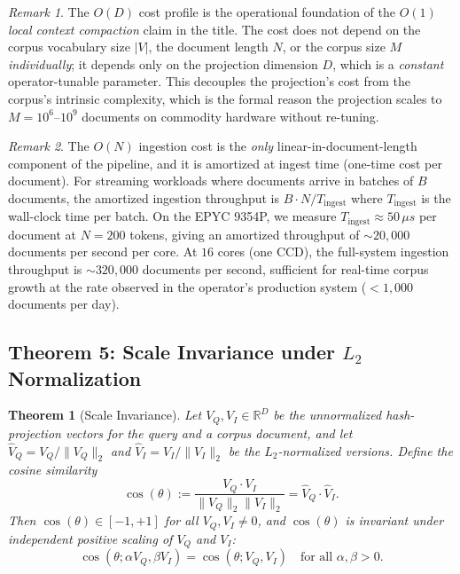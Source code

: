 \documentclass[10pt,twocolumn]{article}
\newtheorem{theorem}{Theorem}
\theoremstyle{definition}
\theoremstyle{remark}
\newtheorem{remark}{Remark}
\begin{document}
\begin{remark}
The $O(D)$ cost profile is the operational foundation of the
\emph{$O(1)$ local context compaction} claim in the title. The cost
does not depend on the corpus vocabulary size $|V|$, the document
length $N$, or the corpus size $M$ \emph{individually}; it depends
only on the projection dimension $D$, which is a \emph{constant}
operator-tunable parameter. This decouples the projection's cost from
the corpus's intrinsic complexity, which is the formal reason the
projection scales to $M = 10^6$--$10^9$ documents on commodity
hardware without re-tuning.
\end{remark}

\begin{remark}
The $O(N)$ ingestion cost is the \emph{only} linear-in-document-length
component of the pipeline, and it is amortized at ingest time (one-time
cost per document). For streaming workloads where documents arrive in
batches of $B$ documents, the amortized ingestion throughput is
$B \cdot N / T_{\mathrm{ingest}}$ where $T_{\mathrm{ingest}}$ is the
wall-clock time per batch. On the EPYC 9354P, we measure
$T_{\mathrm{ingest}} \approx 50 \,\mu s$ per document at $N = 200$
tokens, giving an amortized throughput of $\sim 20{,}000$ documents
per second per core. At $16$ cores (one CCD), the full-system ingestion
throughput is $\sim 320{,}000$ documents per second, sufficient for
real-time corpus growth at the rate observed in the operator's
production system ($< 1{,}000$ documents per day).
\end{remark}

\subsection{Theorem 5: Scale Invariance under $L_2$ Normalization}
\label{thm:scale-invariance}

\begin{theorem}[Scale Invariance]
\label{thm:scale-invariance}
Let $V_Q, V_I \in \mathbb{R}^D$ be the unnormalized hash-projection
vectors for the query and a corpus document, and let
$\hat{V}_Q = V_Q / \|V_Q\|_2$ and $\hat{V}_I = V_I / \|V_I\|_2$ be the
$L_2$-normalized versions. Define the cosine similarity
\begin{equation}
\cos(\theta) := \frac{V_Q \cdot V_I}{\|V_Q\|_2 \|V_I\|_2}
              = \hat{V}_Q \cdot \hat{V}_I.
\label{eq:thm5-cosine}
\end{equation}
Then $\cos(\theta) \in [-1, +1]$ for all $V_Q, V_I \neq 0$, and
$\cos(\theta)$ is invariant under \emph{independent} positive scaling
of $V_Q$ and $V_I$:
\begin{equation}
\cos(\theta; \alpha V_Q, \beta V_I) = \cos(\theta; V_Q, V_I)
   \quad \text{for all } \alpha, \beta > 0.
\label{eq:thm5-invariance}
\end{equation}
\end{theorem}
\end{document}
